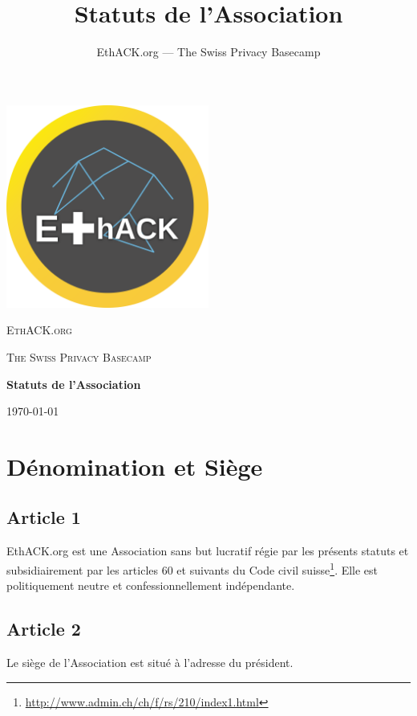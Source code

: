 \documentclass[12pt,twoside]{report}
\author{EthACK.org — The Swiss Privacy Basecamp}
\title{Statuts de l'Association}
\begin{document}
\begin{titlepage}
\centering
\includegraphics[width=0.50\textwidth]{../logo-4096.png}\par\vspace{2cm}
{\scshape\LARGE EthACK.org \par}
\vspace{1cm}
{\scshape\Large The Swiss Privacy Basecamp \par}
\vspace{1.5cm}
{\huge\bfseries Statuts de l'Association\par}

\vfill
{\large \today\par}
\end{titlepage}

\tableofcontents

\setlength{\parindent}{0cm}

\chapter*{Dénomination et Siège}

\section*{Article 1}
EthACK.org est une Association sans but lucratif régie par les présents statuts et subsidiairement par les articles 60 et suivants du Code civil suisse\footnote{\url{http://www.admin.ch/ch/f/rs/210/index1.html}}. Elle est politiquement neutre et confessionnellement indépendante.

\section*{Article 2}
Le siège de l’Association est situé à l’adresse du président.
\end{document}
